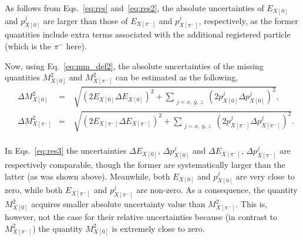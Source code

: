 As follows from Eqs.~\eqref{eq:res} and~\eqref{eq:res2}, the absolute uncertainties of $E_{X[0]}$ and $p_{X[0]}^{j}$ are larger than those of $E_{X[\pi^{-}]}$ and $p_{X[\pi^{-}]}^{j}$, respectively, as the former quantities include extra terms associated with the additional registered particle (which is the $\pi^{-}$ here).


Now, using Eq.~\eqref{eq:mm_def2}, the absolute uncertainties of the missing quantities $M_{X[0]}^{2}$ and $M_{X[\pi^{-}]}^{2}$ can be estimated as the following,
\begin{equation}
\begin{aligned}
&\Delta M_{X[0]}^{2} &=&~\sqrt{ \left (2E_{X[0]} \Delta E_{X[0]} \right )^{2} + \sum_{\substack{j = x,~y,~z}}\left (2p_{X[0]}^{j} \Delta p_{X[0]}^{j} \right )^{2}}, \\
&\Delta M_{X[\pi^{-}]}^{2} &=&~\sqrt{ \left (2E_{X[\pi^{-}]} \Delta E_{X[\pi^{-}]} \right )^{2} +  \sum_{\substack{j = x,~y,~z}}\left (2p_{X[\pi^{-}]}^{j} \Delta p_{X[\pi^{-}]}^{j} \right )^{2}}. \\
\end{aligned}\label{eq:res3}
\end{equation}

In Eqs.~\eqref{eq:res3} the uncertainties $\Delta E_{X[0]}$, $\Delta p_{X[0]}^{j}$ and $ \Delta E_{X[\pi^{-}]}$, $\Delta p_{X[\pi^{-}]}^{j}$ are respectively comparable, though the former are systematically larger than the latter (as was shown above). Meanwhile, both $E_{X[0]}$ and $p_{X[0]}^{j}$ are very close to zero, while both $E_{X[\pi^{-}]}$ and $p^{j}_{X[\pi^{-}]}$ are non-zero. As a consequence, the quantity $M_{X[0]}^{2}$ acquires smaller absolute uncertainty value than $M_{X[\pi^{-}]}^{2} $. This is, however, not the case for their relative uncertainties because (in contrast to $M_{X[\pi^{-}]}^{2}$) the quantity $M_{X[0]}^{2}$ is extremely close to zero.


